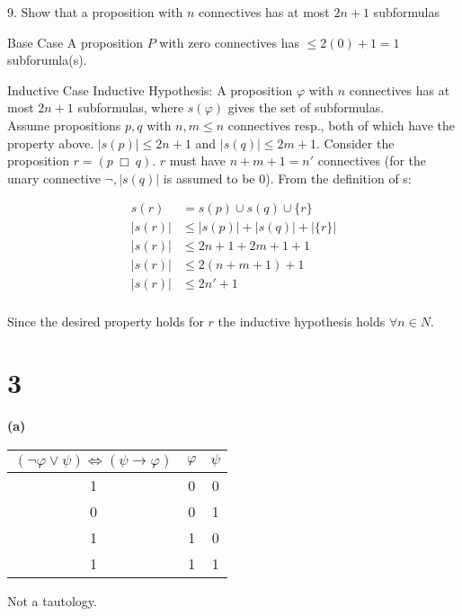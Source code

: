 \documentclass[10pt]{article}
\begin{document}
\begin{description*}
	\item[9.] Show that a proposition with $n$ connectives has at most $2n + 1$ subformulas

  \begin{description*}
  \item[Base Case] A proposition $P$ with zero connectives has $\leq 2(0) + 1 = 1$ subforumla(s).
  \item[Inductive Case] Inductive Hypothesis: A proposition $\varphi$ with $n$ connectives has at most $2n + 1$ subformulas, where $s(\varphi)$ gives the set of subformulas.\\
  Assume propositions $p,q$ with $n,m \leq n$ connectives resp., both of which have the property above. $|s(p)| \leq 2n+1$ and $|s(q)| \leq 2m+1$. Consider the proposition $r = (p\ \Box \ q)$. $r$ must have $n+m+1 = n'$ connectives (for the unary connective $\lnot, |s(q)|$ is assumed to be $0$). From the definition of s:

  \begin{align*}
	s(r) &= s(p) \cup s(q) \cup \{r\} \\
	|s(r)| &\leq |s(p)| + |s(q)| + |\{r\}| \\
	|s(r)| &\leq 2n + 1 + 2m + 1 + 1 \\
	|s(r)| &\leq 2(n+m+1)+1\\
  |s(r)| &\leq 2n'+1\\
  \end{align*}

  Since the desired property holds for $r$ the inductive hypothesis holds $\forall n \in N$.
  \end{description*}

\end{description*}


\section*{3}

\textbf{(a)}

\begin{tabular}{ c || c | c }			
  $(\lnot \varphi \lor \psi) \iff (\psi \to \varphi)$ & $\varphi$ & $\psi$ \\
  \hline
  1 & 0 & 0 \\
  0 & 0 & 1 \\
  1 & 1 & 0 \\
  1 & 1 & 1 \\
  \hline  
\end{tabular}
Not a tautology.\\
\end{document}
